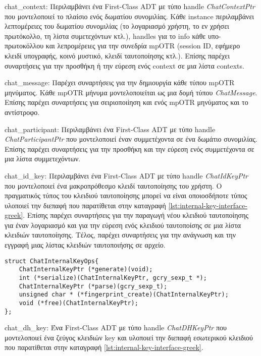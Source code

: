 \begin{description}
  \item chat\_context: Περιλαμβάνει ένα First-Class ADT με τύπο handle \emph{ChatContextPtr} που μοντελοποιεί το πλαίσιο ενός δωματίου συνομιλίας. Κάθε instance περιλαμβάνει λεπτομέρειες του δωματίου συνομιλίας (το λογαριασμό χρήστη, το εν χρήσει πρωτόκολλο, τη λίστα συμετεχόντων κτλ.), handles για το info κάθε υπο-πρωτοκόλλου και λεπρομέρειες για την συνεδρία mpOTR (session ID, εφήμερο κλειδί υπογραφής, κοινό μυστικό, κλειδί ταυτοποίησης κτλ.). Επίσης παρέχει συναρτήσεις για την προσθήκη ή την εύρεση ενός context σε μια λίστα contexts.

  \item chat\_message: Παρέχει συναρτήσεις για την δημιουργία κάθε τύπου mpOTR μηνύματος. Κάθε mpOTR μήνυμα μοντελοποιείται ως μια δομή τύπου \emph{ChatMessage}. Επίσης παρέχει συναρτήσεις για σειριοποιίηση και ενός mpOTR μηνύματος και το αντίστροφο.

  \item chat\_participant: Περιλαμβάνει ένα First-Class ADT με τύπο handle \emph{ChatParticipantPtr} που μοντελοποιεί έναν συμμετέχοντα σε ένα δωμάτιο συνομιλίας. Επίσης παρέχει συναρτήσεις για την προσθήκη και την εύρεση ενός συμμετέχοντα σε μια λίστα συμμετεχόντων.
  
  \item chat\_id\_key: Περιλαμβάνει ένα First-Class ADT με τύπο handle \emph{ChatIdKeyPtr} που μοντελοποιεί ένα μακροπρόθεσμο κλειδί ταυτοποίησης του χρήστη. Ο πραγματικός τύπος του κλειδιού ταυτοποίησης μπορεί να είναι οποιοσδήποτε τύπος υλοποιεί την διεπαφή που παρατίθεται στην καταγραφή \ref{lst:internal-key-interface-greek}. Επίσης παρέχει συναρτήσεις για την παραγωγή νέου κλειδιού ταυτοποίησης για έναν λογαριασμό και για την εύρεση ενός κλειδιού ταυτοποίσης σε μια λίστα κλειδιών ταυτοποίησης. Τέλος, παρέχει συναρτήσεις για την ανάγνωση και την εγγραφή μιας λίστας κλειδιών ταυτοποιήσης σε αρχείο.
  
\begin{lstlisting}[caption={Διεπαφή εσωτερικού κλειδιού},label={lst:internal-key-interface-greek}]
struct ChatInternalKeyOps{
    ChatInternalKeyPtr (*generate)(void);
    int (*serialize)(ChatInternalKeyPtr, gcry_sexp_t *);
    ChatInternalKeyPtr (*parse)(gcry_sexp_t);
    unsigned char * (*fingerprint_create)(ChatInternalKeyPtr);
    void (*free)(ChatInternalKeyPtr);
};
\end{lstlisting}

  \item chat\_dh\_key: Ένα First-Class ADT με τύπο handle \emph{ChatDHKeyPtr} που μοντελοποιεί ένα ζεύγος κλειδιών \dhname key και υλοποιεί την διεπαφή εσωτερικού κλειδιού που παρατίθεται στην καταγραφή \ref{lst:internal-key-interface-greek}.


\end{description}
